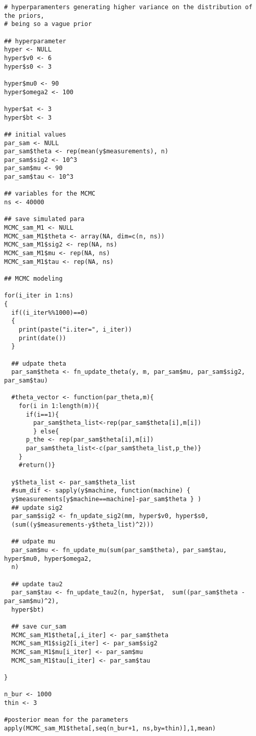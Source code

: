 \documentclass[a4paper, 11pt]{article}
\begin{document}
\begin{verbatim}
# hyperparamenters generating higher variance on the distribution of the priors,
# being so a vague prior

## hyperparameter
hyper <- NULL
hyper$v0 <- 6
hyper$s0 <- 3

hyper$mu0 <- 90
hyper$omega2 <- 100

hyper$at <- 3
hyper$bt <- 3

## initial values
par_sam <- NULL
par_sam$theta <- rep(mean(y$measurements), n)
par_sam$sig2 <- 10^3
par_sam$mu <- 90
par_sam$tau <- 10^3

## variables for the MCMC
ns <- 40000

## save simulated para
MCMC_sam_M1 <- NULL
MCMC_sam_M1$theta <- array(NA, dim=c(n, ns))
MCMC_sam_M1$sig2 <- rep(NA, ns)
MCMC_sam_M1$mu <- rep(NA, ns)
MCMC_sam_M1$tau <- rep(NA, ns)

## MCMC modeling

for(i_iter in 1:ns)
{
  if((i_iter%%1000)==0)
  {
    print(paste("i.iter=", i_iter))
    print(date())
  }
  
  ## udpate theta
  par_sam$theta <- fn_update_theta(y, m, par_sam$mu, par_sam$sig2, par_sam$tau)
  
  #theta_vector <- function(par_theta,m){
    for(i in 1:length(m)){
      if(i==1){
        par_sam$theta_list<-rep(par_sam$theta[i],m[i])
        } else{
      p_the <- rep(par_sam$theta[i],m[i])
      par_sam$theta_list<-c(par_sam$theta_list,p_the)}
    }
    #return()}

  y$theta_list <- par_sam$theta_list
  #sum_dif <- sapply(y$machine, function(machine) { 
  y$measurements[y$machine==machine]-par_sam$theta } )
  ## update sig2
  par_sam$sig2 <- fn_update_sig2(mm, hyper$v0, hyper$s0, 
  (sum((y$measurements-y$theta_list)^2)))
  
  ## udpate mu
  par_sam$mu <- fn_update_mu(sum(par_sam$theta), par_sam$tau, hyper$mu0, hyper$omega2, 
  n)
  
  ## update tau2
  par_sam$tau <- fn_update_tau2(n, hyper$at,  sum((par_sam$theta - par_sam$mu)^2), 
  hyper$bt)
  
  ## save cur_sam
  MCMC_sam_M1$theta[,i_iter] <- par_sam$theta
  MCMC_sam_M1$sig2[i_iter] <- par_sam$sig2
  MCMC_sam_M1$mu[i_iter] <- par_sam$mu
  MCMC_sam_M1$tau[i_iter] <- par_sam$tau
    
}

n_bur <- 1000
thin <- 3

#posterior mean for the parameters
apply(MCMC_sam_M1$theta[,seq(n_bur+1, ns,by=thin)],1,mean)


\end{verbatim}
\end{document}
